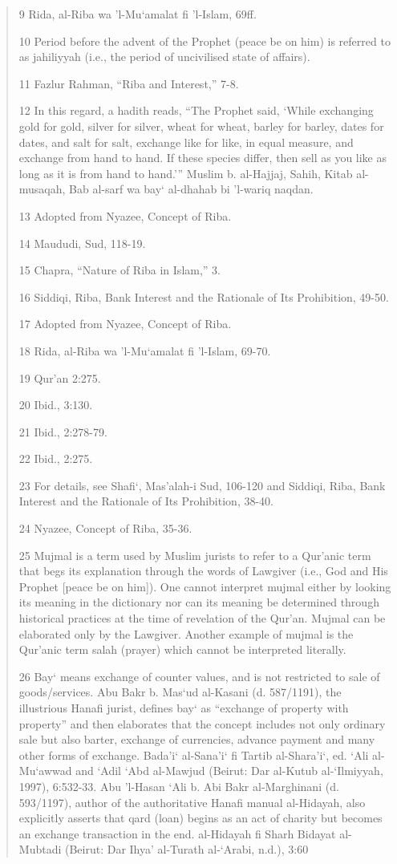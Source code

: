 \begin{quote}
9 Rida, al-Riba wa 'l-Mu‘amalat fi 'l-Islam, 69ff.

10 Period before the advent of the Prophet (peace be on him) is referred to as jahiliyyah (i.e., the period of uncivilised state of affairs).

11 Fazlur Rahman, “Riba and Interest,” 7-8.

12 In this regard, a hadith reads, “The Prophet said, ‘While exchanging gold for gold, silver for silver, wheat for wheat, barley for barley, dates for dates, and salt for salt, exchange like for like, in equal measure, and exchange from hand to hand. If these species differ, then sell as you like as long as it is from hand to hand.'” Muslim b. al-Hajjaj, Sahih, Kitab al-musaqah, Bab al-sarf wa bay‘ al-dhahab bi 'l-wariq naqdan.

13 Adopted from Nyazee, Concept of Riba.

14 Maududi, Sud, 118-19.

15 Chapra, “Nature of Riba in Islam,” 3.

16 Siddiqi, Riba, Bank Interest and the Rationale of Its Prohibition, 49-50.

17 Adopted from Nyazee, Concept of Riba.

18 Rida, al-Riba wa 'l-Mu‘amalat fi 'l-Islam, 69-70.

19 Qur'an 2:275.

20 Ibid., 3:130.

21 Ibid., 2:278-79.

22 Ibid., 2:275.

23 For details, see Shafi‘, Mas'alah-i Sud, 106-120 and Siddiqi, Riba, Bank Interest and the Rationale of Its Prohibition, 38-40.

24 Nyazee, Concept of Riba, 35-36.

25 Mujmal is a term used by Muslim jurists to refer to a Qur'anic term that begs its explanation through the words of Lawgiver (i.e., God and His Prophet [peace be on him]). One cannot interpret mujmal either by looking its meaning in the dictionary nor can its meaning be determined through historical practices at the time of revelation of the Qur'an. Mujmal can be elaborated only by the Lawgiver. Another example of mujmal is the Qur'anic term salah (prayer) which cannot be interpreted literally.

26 Bay‘ means exchange of counter values, and is not restricted to sale of goods/services. Abu Bakr b. Mas‘ud al-Kasani (d. 587/1191), the illustrious Hanafi jurist, defines bay‘ as “exchange of property with property” and then elaborates that the concept includes not only ordinary sale but also barter, exchange of currencies, advance payment and many other forms of exchange. Bada'i‘ al-Sana'i‘ fi Tartib al-Shara'i‘, ed. ‘Ali al-Mu‘awwad and ‘Adil ‘Abd al-Mawjud (Beirut: Dar al-Kutub al-‘Ilmiyyah, 1997), 6:532-33. Abu 'l-Hasan ‘Ali b. Abi Bakr al-Marghinani (d. 593/1197), author of the authoritative Hanafi manual al-Hidayah, also explicitly asserts that qard (loan) begins as an act of charity but becomes an exchange transaction in the end. al-Hidayah fi Sharh Bidayat al-Mubtadi (Beirut: Dar Ihya' al-Turath al-‘Arabi, n.d.), 3:60


\end{quote}
